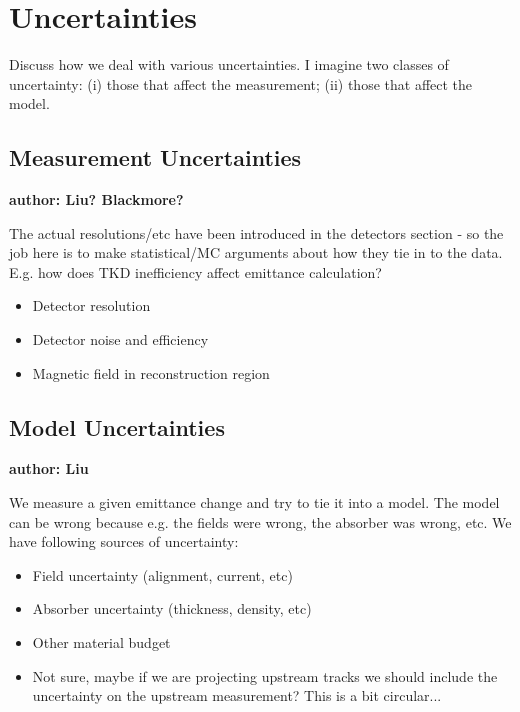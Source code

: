 \section{Uncertainties}

Discuss how we deal with various uncertainties. I imagine two classes of
uncertainty: (i) those that affect the measurement; (ii) those that affect the
model.

\subsection{Measurement Uncertainties}

\bf{author: Liu? Blackmore?}

The actual resolutions/etc have been introduced in the detectors section - so 
the job here is to make statistical/MC arguments about how they tie in to the 
data. E.g. how does TKD inefficiency affect emittance calculation?

\begin{itemize}
\item Detector resolution
\item Detector noise and efficiency
\item Magnetic field in reconstruction region
\end{itemize}

\subsection{Model Uncertainties}

\bf{author: Liu}

We measure a given emittance change and try to tie it into a model. The model
can be wrong because e.g. the fields were wrong, the absorber was wrong, etc. We
have following sources of uncertainty:

\begin{itemize}
\item Field uncertainty (alignment, current, etc)
\item Absorber uncertainty (thickness, density, etc)
\item Other material budget
\item Not sure, maybe if we are projecting upstream tracks we should include the
uncertainty on the upstream measurement? This is a bit circular...
\end{itemize}


